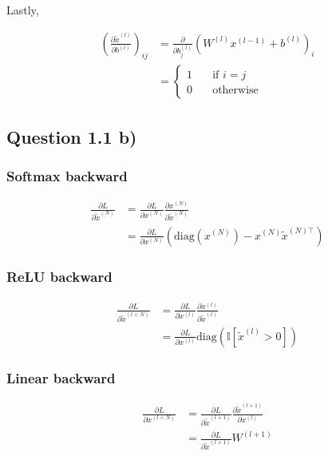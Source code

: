 \documentclass{article}
\begin{document}
Lastly,

\begin{align}
\left(\frac{\partial \tilde{x}^{(l)}}{\partial b^{(l)}}\right)_{ij}
&=
\frac{\partial}{\partial b^{(l)}_j}(W^{(l)}x^{(l-1)}+b^{(l)})_i \\
&=
\left\lbrace
\begin{matrix}
1\quad &\text{if } i = j\\
0\quad &\text{otherwise}
\end{matrix}
\right.
\end{align}

\subsection*{Question 1.1 b)}

\subsubsection*{Softmax backward}

\begin{align}
\frac{\partial L}{\partial\tilde{x}^{(N)}}
&=
\frac{\partial L}{\partial x^{(N)}}\frac{\partial x^{(N)}}{\partial \tilde{x}^{(N)}}\\
&=
\frac{\partial L}{\partial x^{(N)}}\left(\text{diag}(x^{(N)})-x^{(N)}{\tilde{x}^{(N)\top}}\right)
\end{align}

\subsubsection*{ReLU backward}

\begin{align}
\frac{\partial L}{\partial \tilde{x}^{(l<N)}} &= \frac{\partial L}{\partial x^{(l)}}\frac{\partial x^{(l)}}{\partial\tilde{x}^{(l)}}\\
&= \frac{\partial L}{\partial x^{(l)}}\text{diag}(\mathbb{I}[\tilde{x}^{(l)}>0])
\end{align}

\subsubsection*{Linear backward}

\begin{align*}
\frac{\partial L}{\partial x^{(l<N)}} &= \frac{\partial L}{\partial\tilde{x}^{(l+1)}}\frac{\partial\tilde{x}^{(l+1)}}{\partial x^{(l)}} \\
&= \frac{\partial L}{\partial\tilde{x}^{(l+1)}}W^{(l+1)}
\end{align*}
\end{document}
